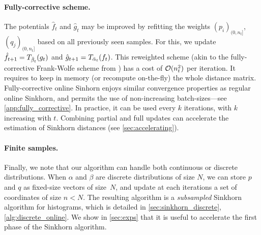 \paragraph{Fully-corrective scheme.} 

The potentials $\hat f_t$ and $\hat g_t$ may be improved by refitting the
weights $(p_i)_{(0, n_t]}$, $(q_j)_{(0, n_t]}$ based on all previously seen
samples.  For this, we update $\hat f_{t+1} = \Ctrans{g_t}{\bar \beta_t}$ and
$\hat g_{t+1} = \Ctrans{f_t}{\bar \alpha_t}$. This reweighted scheme (akin to
the fully-corrective Frank-Wolfe scheme from \cite{lacoste2015global}) has a
cost of $\Oo(n_t^2)$ per iteration. It requires to keep in memory (or recompute
on-the-fly) the whole distance matrix. Fully-corrective online Sinhorn  enjoys
similar convergence properties as regular online Sinkhorn, and permits the use
of non-increasing batch-sizes---see
\autoref{app:fully_corrective}. In practice, it can be used every $k$
iterations, with $k$ increasing with $t$. Combining partial and full updates can
accelerate the estimation of Sinkhorn distances (see \autoref{sec:accelerating}).





\paragraph{Finite samples.}Finally, we note that our algorithm
can handle both continuous or discrete distributions. When $\alpha$ and $\beta$
are discrete distributions of size $N$, we can store $p$ and $q$ as fixed-size
vectors of size~$N$, and update at each iterations a set of coordinates of size $n < N$. The resulting
algorithm is a \textit{subsampled} Sinkhorn algorithm for histograms, which is
detailed in \autoref{sec:sinkhorn_discrete}, \autoref{alg:discrete_online}. We show in \autoref{sec:exps} that it
is useful to accelerate the first phase of the Sinkhorn algorithm.